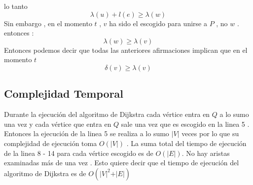 \documentclass[10pt]{article}
\begin{document}
        lo tanto 
        \begin{equation*}
            \lambda\left(u\right) + l\left(e\right) \geq \lambda\left(w\right)
        \end{equation*} 
        Sin embargo , en el momento $t$ , $v$ ha sido el escogido para unirse a $P$ , no  $w$ . entonces : 
        \begin{equation*}
            \lambda\left(w\right) \geq \lambda\left(v\right)
        \end{equation*}
        Entonces podemos decir que todas las anteriores afirmaciones implican que en el momento $t$ 
        \begin{equation*}
            \delta\left(v\right) \geq \lambda\left(v\right)
        \end{equation*}



    
    \subsection{Complejidad Temporal }
        \noindent Durante la ejecuci\'on del algoritmo de Dijkstra cada v\'ertice entra en $Q$ a lo sumo una vez y cada v\'ertice que entra en $Q$ sale 
        una vez que es escogido en la linea 5 . Entonces la ejecuci\'on de la linea 5 se realiza a lo sumo $\vert V \vert$ veces por lo que su complejidad 
        de ejecuci\'on toma $O\left(\vert V \vert\right)$ . La suma total del tiempo de ejecuci\'on de la linea 8 - 14 para cada v\'ertice escogido es de $O\left(\vert E \vert\right)$. 
        No hay aristas examinadas m\'as de una vez . Esto quiere decir que el tiempo de ejecuci\'on del algoritmo de Dijkstra es de $O\left(\vert V \vert ^ 2 + \vert E \vert \right)$
        
        
\end{document}
